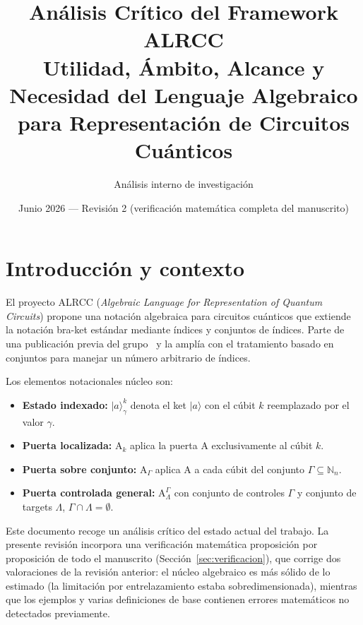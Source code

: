\documentclass[12pt, a4paper]{article}
\title{%
  \textbf{Análisis Crítico del Framework ALRCC}\\
  \large Utilidad, Ámbito, Alcance y Necesidad del Lenguaje Algebraico\\
  para Representación de Circuitos Cuánticos
}
\author{Análisis interno de investigación}
\date{Junio 2026 --- Revisión 2 (verificación matemática completa del manuscrito)}
\newcommand{\gate}[1]{\text{#1}}
\newcommand{\stateket}[3]{\ket{#1}^{#2}_{#3}}
\newcommand{\stategate}[3]{\gate{#1}^{#2}_{#3}}
\newcommand{\ket}[1]{|#1\rangle}
\begin{document}
\maketitle
\tableofcontents
\newpage

\section{Introducción y contexto}

El proyecto ALRCC (\textit{Algebraic Language for Representation of Quantum Circuits})
propone una notación algebraica para circuitos cuánticos que extiende la notación
bra-ket estándar mediante índices y conjuntos de índices.
Parte de una publicación previa del grupo~\cite{reina2024ix} y la amplía con el
tratamiento basado en conjuntos para manejar un número arbitrario de índices.

Los elementos notacionales núcleo son:

\begin{itemize}
  \item \textbf{Estado indexado:} $\stateket{a}{k}{\gamma}$ denota el ket
        $\ket{a}$ con el cúbit $k$ reemplazado por el valor $\gamma$.
  \item \textbf{Puerta localizada:} $\gate{A}_k$ aplica la puerta $\gate{A}$
        exclusivamente al cúbit $k$.
  \item \textbf{Puerta sobre conjunto:} $\gate{A}_\Gamma$ aplica $\gate{A}$
        a cada cúbit del conjunto $\Gamma \subseteq \mathbb{N}_n$.
  \item \textbf{Puerta controlada general:} $\stategate{A}{\Gamma}{\Lambda}$
        con conjunto de controles $\Gamma$ y conjunto de targets $\Lambda$,
        $\Gamma \cap \Lambda = \emptyset$.
\end{itemize}

Este documento recoge un análisis crítico del estado actual del trabajo.
La presente revisión incorpora una verificación matemática proposición por
proposición de todo el manuscrito (Sección~\ref{sec:verificacion}), que
corrige dos valoraciones de la revisión anterior: el núcleo algebraico es
más sólido de lo estimado (la limitación por entrelazamiento estaba
sobredimensionada), mientras que los ejemplos y varias definiciones de base
contienen errores matemáticos no detectados previamente.

\end{document}
